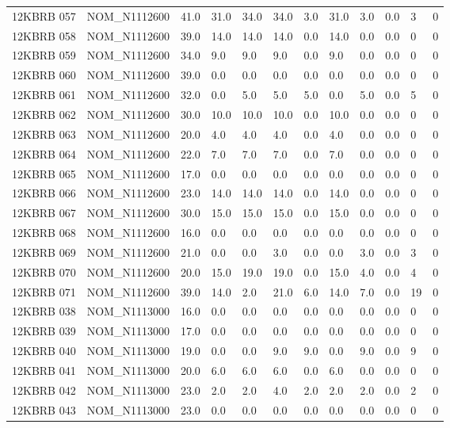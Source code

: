 \begin{table}[htbp]
\begin{tabular}{llllllllllll}
12KBRB 057 & NOM\_N1112600 & 41.0 & 31.0 & 34.0 & 34.0 & 3.0 & 31.0 & 3.0 & 0.0 & 3 & 0 \\
12KBRB 058 & NOM\_N1112600 & 39.0 & 14.0 & 14.0 & 14.0 & 0.0 & 14.0 & 0.0 & 0.0 & 0 & 0 \\
12KBRB 059 & NOM\_N1112600 & 34.0 & 9.0 & 9.0 & 9.0 & 0.0 & 9.0 & 0.0 & 0.0 & 0 & 0 \\
12KBRB 060 & NOM\_N1112600 & 39.0 & 0.0 & 0.0 & 0.0 & 0.0 & 0.0 & 0.0 & 0.0 & 0 & 0 \\
12KBRB 061 & NOM\_N1112600 & 32.0 & 0.0 & 5.0 & 5.0 & 5.0 & 0.0 & 5.0 & 0.0 & 5 & 0 \\
12KBRB 062 & NOM\_N1112600 & 30.0 & 10.0 & 10.0 & 10.0 & 0.0 & 10.0 & 0.0 & 0.0 & 0 & 0 \\
12KBRB 063 & NOM\_N1112600 & 20.0 & 4.0 & 4.0 & 4.0 & 0.0 & 4.0 & 0.0 & 0.0 & 0 & 0 \\
12KBRB 064 & NOM\_N1112600 & 22.0 & 7.0 & 7.0 & 7.0 & 0.0 & 7.0 & 0.0 & 0.0 & 0 & 0 \\
12KBRB 065 & NOM\_N1112600 & 17.0 & 0.0 & 0.0 & 0.0 & 0.0 & 0.0 & 0.0 & 0.0 & 0 & 0 \\
12KBRB 066 & NOM\_N1112600 & 23.0 & 14.0 & 14.0 & 14.0 & 0.0 & 14.0 & 0.0 & 0.0 & 0 & 0 \\
12KBRB 067 & NOM\_N1112600 & 30.0 & 15.0 & 15.0 & 15.0 & 0.0 & 15.0 & 0.0 & 0.0 & 0 & 0 \\
12KBRB 068 & NOM\_N1112600 & 16.0 & 0.0 & 0.0 & 0.0 & 0.0 & 0.0 & 0.0 & 0.0 & 0 & 0 \\
12KBRB 069 & NOM\_N1112600 & 21.0 & 0.0 & 0.0 & 3.0 & 0.0 & 0.0 & 3.0 & 0.0 & 3 & 0 \\
12KBRB 070 & NOM\_N1112600 & 20.0 & 15.0 & 19.0 & 19.0 & 0.0 & 15.0 & 4.0 & 0.0 & 4 & 0 \\
12KBRB 071 & NOM\_N1112600 & 39.0 & 14.0 & 2.0 & 21.0 & 6.0 & 14.0 & 7.0 & 0.0 & 19 & 0 \\
12KBRB 038 & NOM\_N1113000 & 16.0 & 0.0 & 0.0 & 0.0 & 0.0 & 0.0 & 0.0 & 0.0 & 0 & 0 \\
12KBRB 039 & NOM\_N1113000 & 17.0 & 0.0 & 0.0 & 0.0 & 0.0 & 0.0 & 0.0 & 0.0 & 0 & 0 \\
12KBRB 040 & NOM\_N1113000 & 19.0 & 0.0 & 0.0 & 9.0 & 9.0 & 0.0 & 9.0 & 0.0 & 9 & 0 \\
12KBRB 041 & NOM\_N1113000 & 20.0 & 6.0 & 6.0 & 6.0 & 0.0 & 6.0 & 0.0 & 0.0 & 0 & 0 \\
12KBRB 042 & NOM\_N1113000 & 23.0 & 2.0 & 2.0 & 4.0 & 2.0 & 2.0 & 2.0 & 0.0 & 2 & 0 \\
12KBRB 043 & NOM\_N1113000 & 23.0 & 0.0 & 0.0 & 0.0 & 0.0 & 0.0 & 0.0 & 0.0 & 0 & 0 \\

\end{tabular}
\end{table}
